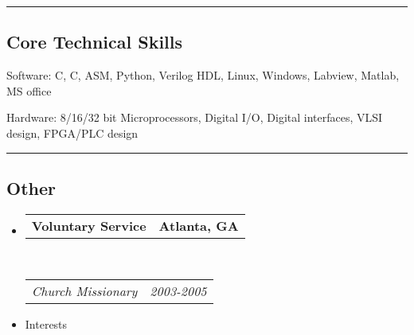 \documentclass[10pt,letterpaper]{article}
\makeatletter
\newenvironment{indentsection}[1]%
{\begin{list}{}%
	{\setlength{\leftmargin}{#1}}%
	\item[]%
}
{\end{list}}
\newcommand{\headerrow}[2]
{\begin{tabular*}{\linewidth}{l@{\extracolsep{\fill}}r}
	#1 &
	#2 \\
\end{tabular*}}
\newcommand{\CPP}
{C\nolinebreak[4]\hspace{-.05em}\raisebox{.22ex}{\footnotesize\bf ++}}
\makeatother
\begin{document}
\hrule
\vspace{-0.4em}
\subsection*{Core Technical Skills}

\begin{indentsection}{\parindent}
\begin{description*}
	\item[Software:]
	C, \CPP, ASM, Python, Verilog HDL, Linux, Windows, Labview, Matlab, MS office 
	\item[Hardware:]
	8/16/32 bit Microprocessors, Digital I/O, Digital interfaces, VLSI design, FPGA/PLC design
\end{description*}
\end{indentsection}

\hrule
\vspace{-0.4em}
\subsection*{Other}

\begin{itemize}
	\parskip=0.1em

	\item 
	\headerrow
		{\textbf{Voluntary Service}}
		{\textbf{Atlanta, GA}}
	\\
	\headerrow
		{\emph{Church Missionary}}
		{\emph{2003-2005}}
        \item Interests


\end{itemize}
\end{document}
